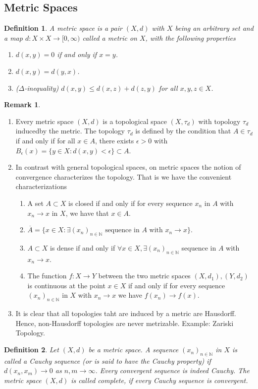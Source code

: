 \documentclass[11pt,a4paper]{article}
\newtheorem{defn}{Definition}[section]
\theoremstyle{definition}
\newtheorem{rem}{Remark}[section]
\begin{document}
\subsection{Metric Spaces}
\begin{defn} A metric space is a pair $(X,d)$ with $X$ being an arbitrary set and a map $d: X \times X \to [0, \infty)$ called a metric on $X$, with the following properties
\begin{enumerate}
\item $d(x,y)=0$ if and only if $x=y$.
\item $d(x,y)=d(y,x)$.
\item ($\Delta$-inequality) $d(x,y) \leq d(x,z) + d(z,y)$ for all $x,y,z \in X$. 
\end{enumerate}
\end{defn}
\begin{rem} \
\begin{enumerate}
\item Every metric space $(X,d)$ is a topological space $(X, \tau_d)$ with topology $\tau_d$ inducedby the metric. The topology $\tau_d$ is defined by the condition that $A \in \tau_d$ if and only if for all $x \in A$, there exists $\epsilon >0$ with $B_\epsilon(x)= \lbrace y \in X : d(x,y) < \epsilon \rbrace \subset A$. 
\item In contrast with general topological spaces, on metric spaces the notion of convergence characterizes the topology. That is we have the convenient characterizations
\begin{enumerate}
\item A set $A\subset X$ is closed if and only if for every sequence $x_n$ in $A$ with $x_n \to x$ in $X$, we have that $x \in A$. 
\item $\overline{A}= \lbrace x \in X : \exists (x_n)_{n \in \mathbb{N}} \text{ sequence in $A$ with } x_n \to x \rbrace $. 
\item $A \subset X$ is dense if and only if $\forall x \in X, \exists (x_n)_{n \in \mathbb{N}}$ sequence in $A$ with $x_n \to x$. 
\item The function $f: X \to Y$ between the two metric spaces $(X,d_1), (Y,d_2)$ is continuous at the point $x \in X$ if and only if for every sequence $(x_n)_{n \in \mathbb{N}}$ in $X$ with $x_n \to x$ we have $f(x_n) \to f(x)$. 
\end{enumerate}
\newpage
\item It is clear that all topologies taht are induced by a metric are Hausdorff. Hence, non-Hausdorff topologies are never metrizable. Example: Zariski Topology.
\end{enumerate}
\end{rem}
\begin{defn} Let $(X,d)$ be a metric space. A sequence $(x_n)_{n \in \mathbb{N}}$ in $X$ is called a Cauchy sequence (or is said to have the Cauchy property) if $d(x_n,x_m) \to 0$ as $n,m \to \infty$. Every convergent sequence is indeed Cauchy. The metric space $(X,d)$ is called complete, if every Cauchy sequence is convergent. 
\end{defn}
\end{document}
